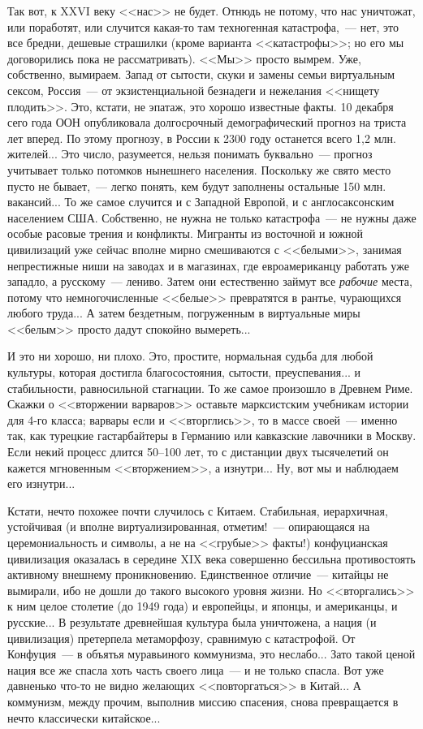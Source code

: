 \documentclass{scrbook}
\newcommand{\flqq}{<<}
\newcommand{\frqq}{>>}
\newcommand{\mdash}{~--- }
\newcommand{\ndash}{--}
\newcommand{\commamdash}{~--- } %
\begin{document}
Так вот, к XXVI веку {\flqq}нас{\frqq} не будет. Отнюдь не потому, что нас уничтожат, или поработят, или случится какая-то там техногенная катастрофа,{\commamdash}нет, это все бредни, дешевые страшилки (кроме варианта {\flqq}катастрофы{\frqq}; но его мы договорились пока не рассматривать). {\flqq}Мы{\frqq} просто вымрем. Уже, собственно, вымираем. Запад от сытости, скуки и замены семьи виртуальным сексом, Россия{\mdash}от экзистенциальной безнадеги и нежелания {\flqq}нищету плодить{\frqq}. Это, кстати, не эпатаж, это хорошо известные факты. 10 декабря сего года ООН опубликовала долгосрочный демографический прогноз на триста лет вперед. По этому прогнозу, в России к 2300 году останется всего 1,2 млн. жителей... Это число, разумеется, нельзя понимать буквально{\mdash}прогноз учитывает только потомков нынешнего населения. Поскольку же свято место пусто не бывает,{\commamdash}легко понять, кем будут заполнены остальные 150 млн. вакансий... То же самое случится и с Западной Европой, и с англосаксонским населением США. Собственно, не нужна не только катастрофа{\mdash}не нужны даже особые расовые трения и конфликты. Мигранты из восточной и южной цивилизаций уже сейчас вполне мирно смешиваются с {\flqq}белыми{\frqq}, занимая непрестижные ниши на заводах и в магазинах, где евроамериканцу работать уже западло, а русскому{\mdash}лениво. Затем они естественно займут все \emph{рабочие} места, потому что немногочисленные {\flqq}белые{\frqq} превратятся в рантье, чурающихся любого труда... А затем бездетным, погруженным в виртуальные миры {\flqq}белым{\frqq} просто дадут спокойно вымереть...

И это ни хорошо, ни плохо. Это, простите, нормальная судьба для любой культуры, которая достигла благосостояния, сытости, преуспевания... и стабильности, равносильной стагнации. То же самое произошло в Древнем Риме. Скажки о {\flqq}вторжении варваров{\frqq} оставьте марксистским учебникам истории для 4-го класса; варвары если и {\flqq}вторглись{\frqq}, то в массе своей{\mdash}именно так, как турецкие гастарбайтеры в Германию или кавказские лавочники в Москву. Если некий процесс длится 50{\ndash}100 лет, то с дистанции двух тысячелетий он кажется мгновенным {\flqq}вторжением{\frqq}, а изнутри... Ну, вот мы и наблюдаем его изнутри...

Кстати, нечто похожее почти случилось с Китаем. Стабильная, иерархичная, устойчивая (и вполне виртуализированная, отметим!{\mdash}опирающаяся на церемониальность и символы, а не на {\flqq}грубые{\frqq} факты!) конфуцианская цивилизация оказалась в середине XIX века совершенно бессильна противостоять активному внешнему проникновению. Единственное отличие{\mdash}китайцы не вымирали, ибо не дошли до такого высокого уровня жизни. Но {\flqq}вторгались{\frqq} к ним целое столетие (до 1949 года) и европейцы, и японцы, и американцы, и русские... В результате древнейшая культура была уничтожена, а нация (и цивилизация) претерпела метаморфозу, сравнимую с катастрофой. От Конфуция{\mdash}в объятья муравьиного коммунизма, это неслабо... Зато такой ценой нация все же спасла хоть часть своего лица{\mdash}и не только спасла. Вот уже давненько что-то не видно желающих {\flqq}повторгаться{\frqq} в Китай... А коммунизм, между прочим, выполнив миссию спасения, снова превращается в нечто классически китайское...
\end{document}
